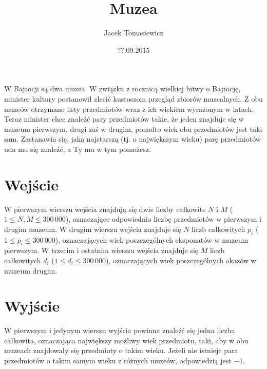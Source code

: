 \documentclass[zad,zawodnik,utf8]{sinol}
\title{Muzea}
\author{Jacek Tomasiewicz} %
\date{??.09.2015}
\begin{document}
\begin{tasktext}%
W Bajtocji są dwa muzea. W związku z rocznicą wielkiej bitwy o Bajtocję, minister kultury postanowił zlecić kustoszom przegląd zbiorów muzealnych. Z obu muzeów otrzymano listy przedmiotów wraz z ich wiekiem wyrażonym w latach. Teraz minister chce znaleźć pary przedmiotów takie, że jeden znajduje się w muzeum pierwszym, drugi zaś w drugim, ponadto wiek obu przedmiotów jest taki sam. Zastanawia się, jaką najstarszą (tj. o największym wieku) parę przedmiotów uda mu się znaleźć, a Ty mu w tym pomożesz.

  \section{Wejście}
W pierwszym wierszu wejścia znajdują się dwie liczby całkowite $N$ i $M$ ($ 1 \leq N, M \leq 300\,000$), oznaczające odpowiednio liczbę przedmiotów w pierwszym i drugim muzeum.
W drugim wierszu wejścia znajduje się $N$ liczb całkowitych $p_i$ ($ 1 \leq p_i \leq 300\,000$), oznaczających wiek poszczególnych eksponatów w muzeum pierwszym. W trzecim i ostatnim wierszu wejścia znajduje się $M$ liczb całkowitych $d_i$ ($ 1 \leq d_i \leq 300\,000$), oznaczających wiek poszczególnych okazów w muzeum drugim.

  \section{Wyjście}
W pierwszym i jedynym wierszu wyjścia powinna znaleźć się jedna liczba całkowita, oznaczająca największy możliwy wiek przedmiotu, taki, aby w obu muzeach znajdowały się przedmioty o takim wieku. Jeżeli nie istnieje para przedmiotów o takim samym wieku z różnych muzeów, odpowiedzią jest $-1$.

\makecompactexample

\end{tasktext}
\end{document}
